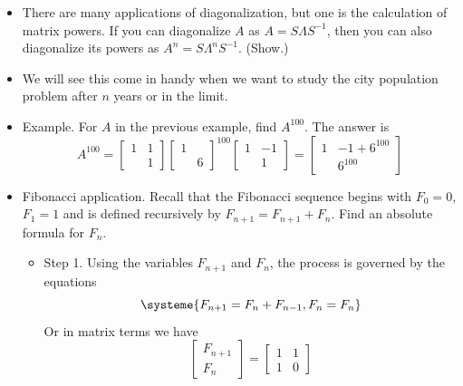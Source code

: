 \documentclass[11pt,oneside]{amsbook}
\theoremstyle{definition}
\theoremstyle{plain}
\theoremstyle{definition}
\theoremstyle{remark}
\numberwithin{equation}{section}
\numberwithin{figure}{section}
\begin{document}
\begin{itemize}
  \[A=\begin{bmatrix}1&5\\&6\end{bmatrix}
  \]
  the solution is
  \[A=\begin{bmatrix}1&1\\&1\end{bmatrix}
    \begin{bmatrix}1&\\&6\end{bmatrix}
    \begin{bmatrix}1&-1\\&1\end{bmatrix}
  \]
\item There are many applications of diagonalization, but one is the calculation of matrix powers. If you can diagonalize $A$ as $A=S\Lambda S^{-1}$, then you can also diagonalize its powers as $A^n=S\Lambda^nS^{-1}$. (Show.)
\item We will see this come in handy when we want to study the city population problem after $n$ years or in the limit.
\item Example. For $A$ in the previous example, find $A^{100}$. The answer is
  \[A^{100}=\begin{bmatrix}1&1\\&1\end{bmatrix}
    \begin{bmatrix}1&\\&6\end{bmatrix}^{100}
    \begin{bmatrix}1&-1\\&1\end{bmatrix}
    =\begin{bmatrix}1&-1+6^{100}\\&6^{100}\end{bmatrix}
  \]
\item Fibonacci application. Recall that the Fibonacci sequence begins with $F_0=0$, $F_1=1$ and is defined recursively by $F_{n+1}=F_{n+1}+F_n$. Find an absolute formula for $F_n$.
  \begin{itemize}
  \item Step 1. Using the variables $F_{n+1}$ and $F_n$, the process is governed by the equations
    \[\systeme{F_{n+1}=F_n+F_{n-1},F_n=F_n}
    \]
    Or in matrix terms we have
    \[\begin{bmatrix}F_{n+1}\\F_n\end{bmatrix}
      =\begin{bmatrix}1&1\\1&0\end{bmatrix}
\]
\end{itemize}
\end{itemize}
\end{document}

